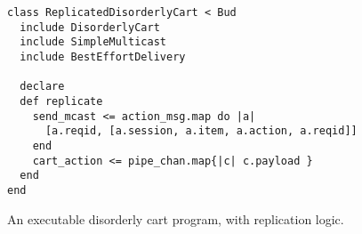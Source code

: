 \begin{figure}[h]
\begin{scriptsize}
\begin{lstlisting}
class ReplicatedDisorderlyCart < Bud
  include DisorderlyCart
  include SimpleMulticast
  include BestEffortDelivery

  declare
  def replicate
    send_mcast <= action_msg.map do |a| 
      [a.reqid, [a.session, a.item, a.action, a.reqid]] 
    end
    cart_action <= pipe_chan.map{|c| c.payload }
  end
end
\end{lstlisting}
\centering
\vspace{-10pt}
\caption{An executable disorderly cart program, with replication logic.}
\label{fig:multicast-impl}
\end{scriptsize}
\vspace{-2pt}
\end{figure}